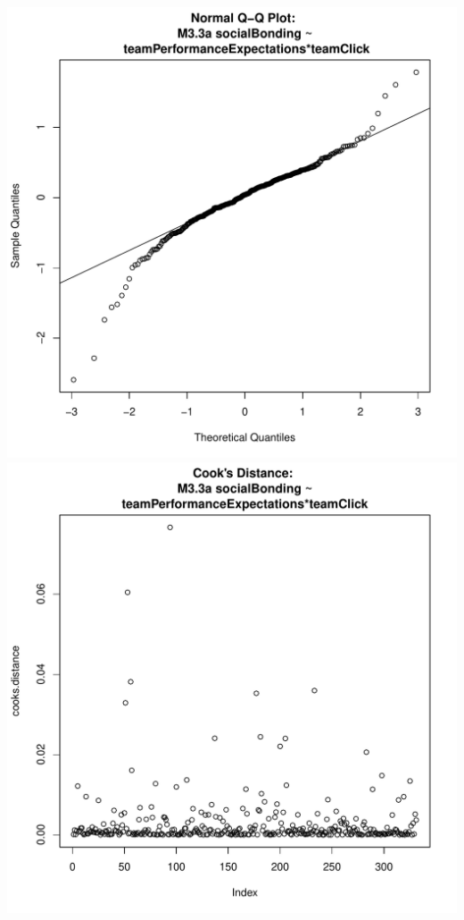 \documentclass[12pt]{report}
\begin{document}
\includegraphics[scale =.4]{../images/MLM33aQQNorm.pdf}
\includegraphics[scale =.4]{../images/MLM33aCooksD.pdf}
\end{document}
